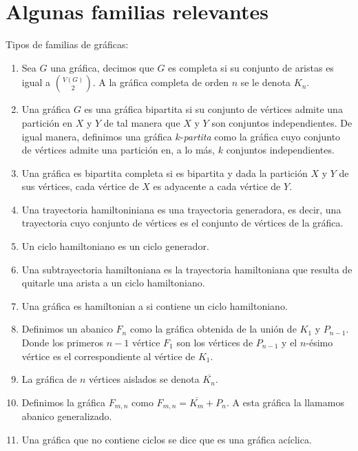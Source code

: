 \section{Algunas familias relevantes}
\label{sec:famGraf}
\begin{definicion} Tipos de familias de gr\'aficas:
    \label{def:familias}
    \begin{enumerate}
        \item Sea $G$ una gr\'afica, decimos que $G$ es completa si su conjunto
        de aristas es igual a $\binom{V(G)}{2}$. A la gr\'afica completa de
        orden $n$ se le denota $K_n$.
        \item Una gr\'afica $G$ es una gr\'afica bipartita si su conjunto de
        v\'ertices admite una partici\'on en $X$ y $Y$ de tal manera que $X$ y
        $Y$ son conjuntos independientes. De igual manera, definimos una
        gr\'afica $k$-\textit{partita} como la gr\'afica cuyo conjunto de
        v\'ertices admite una partici\'on en, a lo m\'as, $k$ conjuntos
        independientes.
        \item Una gr\'afica es bipartita completa si es bipartita y dada la
        partici\'on $X$ y $Y$ de sus v\'ertices, cada v\'ertice de $X$ es
        adyacente a cada v\'ertice de $Y$. 
        \item Una trayectoria hamiltoniniana es una trayectoria generadora, es
        decir, una trayectoria cuyo conjunto de v\'ertices es el conjunto de
        v\'ertices de la gr\'afica. 
        \item Un ciclo hamiltoniano es un ciclo generador. 
        \item Una subtrayectoria hamiltoniana es la trayectoria hamiltoniana que
        resulta de quitarle una arista a un ciclo hamiltoniano.
        \item Una gr\'afica es hamiltonian a si contiene un ciclo hamiltoniano. 
        \item Definimos un abanico $F_n$ como la gr\'afica obtenida de la
        uni\'on de $K_1$ y $P_{n-1}$. Donde los primeros $n-1$ v\'ertice $F_1$
        son los v\'ertices de $P_{n-1}$ y el $n$-\'esimo v\'ertice es el
        correspondiente al v\'ertice de $K_1$.
        \item La gr\'afica de $n$ v\'ertices aislados se denota $\overline{K_n}$.
        \item Definimos la gr\'afica $F_{m,n}$ como
        $F_{m,n}=\overline{K_m}+P_n$. A esta gr\'afica la llamamos abanico
        generalizado.
        \item Una gr\'afica que no contiene ciclos se dice que es una gr\'afica
        ac\'iclica.
    \end{enumerate}
\end{definicion}


